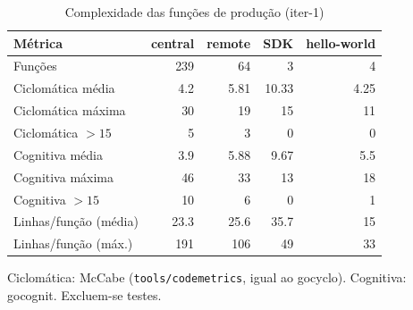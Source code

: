 \begin{table}[htbp]
  \centering\small
  \caption{Complexidade das funções de produção (iter-1)}
  \label{tab:iter-1-complexidade}
  \begin{tabular}{lrrrr}
    \toprule
    Métrica & central & remote & SDK & hello-world \\
    \midrule
    Funções & 239 & 64 & 3 & 4 \\
    Ciclomática média & 4.2 & 5.81 & 10.33 & 4.25 \\
    Ciclomática máxima & 30 & 19 & 15 & 11 \\
    Ciclomática $>15$ & 5 & 3 & 0 & 0 \\
    Cognitiva média & 3.9 & 5.88 & 9.67 & 5.5 \\
    Cognitiva máxima & 46 & 33 & 13 & 18 \\
    Cognitiva $>15$ & 10 & 6 & 0 & 1 \\
    Linhas/função (média) & 23.3 & 25.6 & 35.7 & 15 \\
    Linhas/função (máx.) & 191 & 106 & 49 & 33 \\
    \bottomrule
  \end{tabular}
  \par\smallskip\footnotesize Ciclomática: McCabe (\texttt{tools/codemetrics}, igual ao gocyclo). Cognitiva: gocognit. Excluem-se testes.
\end{table}
